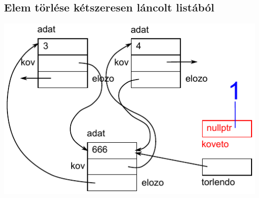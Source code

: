 \subsection{Elem törlése kétszeresen láncolt listából}
\begin{frame}
  \begin{center}
    \includegraphics[scale=0.55]{lista2/list2-10.pdf}
  \end{center}
  \vspace{-.4cm}
  \scriptsize
  \begin{exampleblock}{}
    \tiny
    \vspace{-.2cm}
    
    \vspace{-.2cm}
  \end{exampleblock}
\end{frame}

